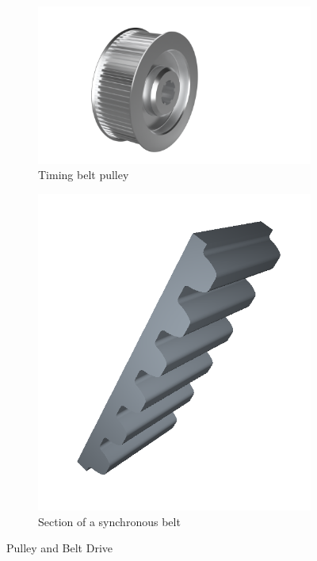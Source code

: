 \documentclass[main.tex]{subfiles}
\begin{document}
\begin{figure}[H]
            \centering
    \begin{subfigure}{0.5\textwidth}
        \includegraphics[width=\linewidth]{images/fig16}
        \caption{Timing belt pulley}
        \end{subfigure}

        \begin{subfigure}{0.25\textwidth}
        \includegraphics[width=\linewidth]{images/belt.png}
        \caption{Section of a synchronous belt}
        \end{subfigure}
        \caption{Pulley and Belt Drive}
        \label{fig:pulley}
\end{figure}
\end{document}
